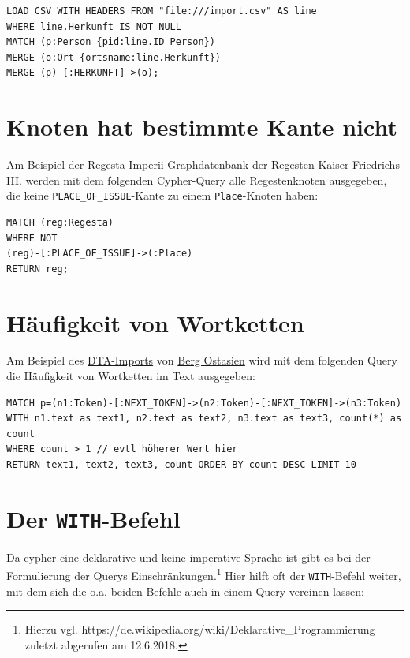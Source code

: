 \documentclass[ngerman,]{scrreprt}
\begin{document}
\begin{verbatim}
LOAD CSV WITH HEADERS FROM "file:///import.csv" AS line
WHERE line.Herkunft IS NOT NULL
MATCH (p:Person {pid:line.ID_Person})
MERGE (o:Ort {ortsname:line.Herkunft})
MERGE (p)-[:HERKUNFT]->(o);
\end{verbatim}

\section{Knoten hat bestimmte Kante nicht}\label{knoten-hat-bestimmte-kante-nicht}

Am Beispiel der \href{http://134.176.70.65:10210/browser/}{Regesta-Imperii-Graphdatenbank} der Regesten Kaiser Friedrichs III. werden mit dem folgenden Cypher-Query alle Regestenknoten ausgegeben, die keine \texttt{PLACE\_OF\_ISSUE}-Kante zu einem \texttt{Place}-Knoten haben:

\begin{verbatim}
MATCH (reg:Regesta)
WHERE NOT
(reg)-[:PLACE_OF_ISSUE]->(:Place)
RETURN reg;
\end{verbatim}

\section{Häufigkeit von Wortketten}\label{huxe4ufigkeit-von-wortketten}

Am Beispiel des \href{http://134.176.70.65:10220/browser/}{DTA-Imports} von \href{http://www.deutschestextarchiv.de/book/show/berg_ostasien01_1864}{Berg Ostasien} wird mit dem folgenden Query die Häufigkeit von Wortketten im Text ausgegeben:

\begin{verbatim}
MATCH p=(n1:Token)-[:NEXT_TOKEN]->(n2:Token)-[:NEXT_TOKEN]->(n3:Token)
WITH n1.text as text1, n2.text as text2, n3.text as text3, count(*) as count
WHERE count > 1 // evtl höherer Wert hier
RETURN text1, text2, text3, count ORDER BY count DESC LIMIT 10
\end{verbatim}

\section{\texorpdfstring{Der \texttt{WITH}-Befehl}{Der WITH-Befehl}}\label{der-with-befehl}

Da cypher eine deklarative und keine imperative Sprache ist gibt es bei der Formulierung der Querys Einschränkungen.\footnote{Hierzu vgl. https://de.wikipedia.org/wiki/Deklarative\_Programmierung zuletzt abgerufen am 12.6.2018.} Hier hilft oft der \texttt{WITH}-Befehl weiter, mit dem sich die o.a. beiden Befehle auch in einem Query vereinen lassen:
\end{document}

